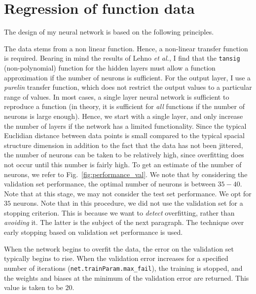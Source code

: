 \documentclass[10pt,a4paper]{article}
\author{Jannes Nys}
\begin{document}
\section{Regression of function data}
The design of my neural network is based on the following principles.

The data stems from a non linear function. Hence, a non-linear transfer function is required. Bearing in mind the results of Lehno \textit{et al.}, I find that the \texttt{tansig} (non-polynomial) function for the hidden layers must allow a function approximation if the number of neurons is sufficient. For the output layer, I use a \textit{purelin} transfer function, which does not restrict the output values to a particular range of values. In most cases, a single layer neural network is sufficient to reproduce a function (in theory, it is sufficient for \textit{all} functions if the number of neurons is large enough). Hence, we start with a single layer, and only increase the number of layers if the network has a limited functionality. Since the typical Euclidian distance between data points is small compared to the typical spacial structure dimension in addition to the fact that the data has not been jittered, the number of neurons can be taken to be relatively high, since overfitting does not occur until this number is fairly high. To get an estimate of the number of neurons, we refer to Fig.~\ref{fig:performance_val}. We note that by considering the validation set performance, the optimal number of neurons is between $35 - 40$. Note that at this stage, we may not consider the test set performance. We opt for $35$ neurons. Note that in this procedure, we did not use the validation set for a stopping criterion. This is because we want to \textit{detect} overfitting, rather than \textit{avoiding} it. The latter is the subject of the next paragraph. The technique over early stopping based on validation set performance is used.

When the network begins to overfit the data, the error on the validation set typically begins to rise. When the validation error increases for a specified number of iterations (\texttt{net.trainParam.max\_fail}), the training is stopped, and the weights and biases at the minimum of the validation error are returned. This value is taken to be $20$.
\end{document}
